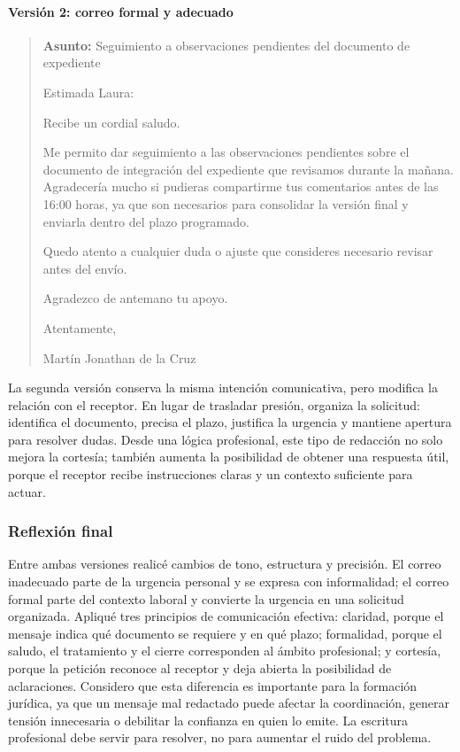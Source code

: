 \paragraph{Versión 2: correo formal y adecuado}

\begin{quote}
\textbf{Asunto:} Seguimiento a observaciones pendientes del documento de expediente

Estimada Laura:

Recibe un cordial saludo.

Me permito dar seguimiento a las observaciones pendientes sobre el documento de integración del expediente que revisamos durante la mañana. Agradecería mucho si pudieras compartirme tus comentarios antes de las 16:00 horas, ya que son necesarios para consolidar la versión final y enviarla dentro del plazo programado.

Quedo atento a cualquier duda o ajuste que consideres necesario revisar antes del envío.

Agradezco de antemano tu apoyo.

Atentamente,

Martín Jonathan de la Cruz
\end{quote}

La segunda versión conserva la misma intención comunicativa, pero modifica la relación con el receptor. En lugar de trasladar presión, organiza la solicitud: identifica el documento, precisa el plazo, justifica la urgencia y mantiene apertura para resolver dudas. Desde una lógica profesional, este tipo de redacción no solo mejora la cortesía; también aumenta la posibilidad de obtener una respuesta útil, porque el receptor recibe instrucciones claras y un contexto suficiente para actuar.

\subsubsection{Reflexión final}

Entre ambas versiones realicé cambios de tono, estructura y precisión. El correo inadecuado parte de la urgencia personal y se expresa con informalidad; el correo formal parte del contexto laboral y convierte la urgencia en una solicitud organizada. Apliqué tres principios de comunicación efectiva: claridad, porque el mensaje indica qué documento se requiere y en qué plazo; formalidad, porque el saludo, el tratamiento y el cierre corresponden al ámbito profesional; y cortesía, porque la petición reconoce al receptor y deja abierta la posibilidad de aclaraciones. Considero que esta diferencia es importante para la formación jurídica, ya que un mensaje mal redactado puede afectar la coordinación, generar tensión innecesaria o debilitar la confianza en quien lo emite. La escritura profesional debe servir para resolver, no para aumentar el ruido del problema.


